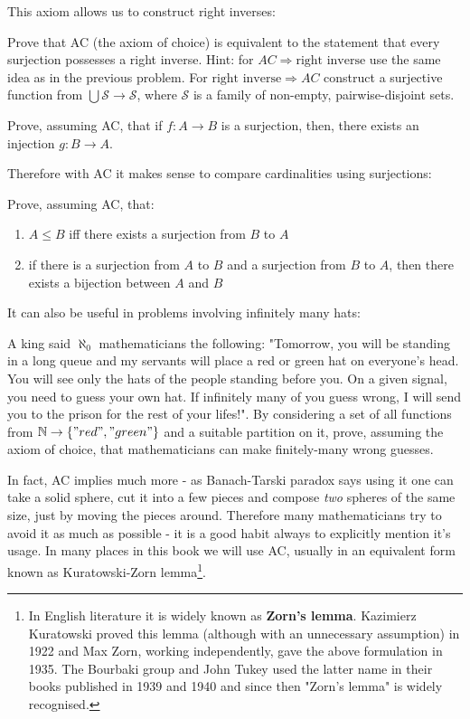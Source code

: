 This axiom allows us to construct right inverses:

\begin{exercise}
  Prove that AC (the axiom of choice) is equivalent to the statement that every surjection possesses a right inverse. Hint: for $AC\Rightarrow \text{right inverse}$ use the same idea as in the previous problem. For
  $\text{right inverse}\Rightarrow AC$ construct a surjective function from $\bigcup \mathcal S\to \mathcal S$, where $\mathcal S$ is a family of non-empty, pairwise-disjoint sets.
\end{exercise}

\begin{exercise}
  Prove, assuming AC, that if $f:A\to B$ is a surjection, then, there exists an injection $g: B\to A$.
\end{exercise}

Therefore with AC it makes sense to compare cardinalities using surjections:

\begin{exercise}
  Prove, assuming AC, that:
  \begin{enumerate}
    \item $A\le B$ iff there exists a surjection from $B$ to $A$
    \item if there is a surjection from $A$ to $B$ and a surjection from $B$ to $A$, then there exists a bijection between $A$ and $B$
  \end{enumerate}
\end{exercise}

It can also be useful in problems involving infinitely many hats:

\begin{exercise}
  A king said $\aleph_0$ mathematicians the following:
  "Tomorrow, you will be standing in a long queue and my servants will place a red or green hat on everyone's head. You will see only the hats of the people standing before you.
  On a given signal, you need to guess your own hat. If infinitely many of you guess wrong, I will send you to the prison for the rest of your lifes!".
  By considering a set of all functions from $\mathbb N\to \{"red", "green"\}$ and a suitable partition on it, prove, assuming the axiom of choice, that mathematicians can make finitely-many
  wrong guesses.
\end{exercise}

In fact, AC implies much more - as Banach-Tarski paradox says using it one can take a solid sphere, cut it into a few pieces and compose \emph{two} spheres of the same size, just by moving the pieces around. Therefore many mathematicians try to avoid it as much as possible - it is a good habit always to explicitly mention it's usage. In many places in this book we will use AC, usually in an equivalent form known as Kuratowski-Zorn lemma\footnote{In English literature it is widely known as \textbf{Zorn's lemma}. Kazimierz Kuratowski proved this lemma (although with an unnecessary assumption) in 1922 and Max Zorn, working independently, gave the above formulation in 1935. The Bourbaki group and John Tukey used the latter name in their books published in 1939 and 1940 and since then "Zorn's lemma" is widely recognised.}.

